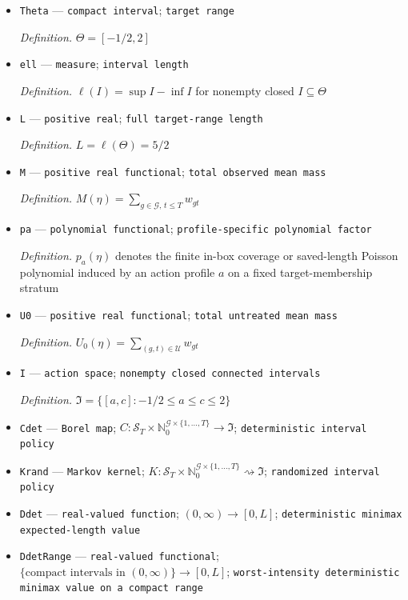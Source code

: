 \documentclass{article}
\begin{document}
\begin{itemize}
  \item \texttt{Theta} --- \texttt{compact interval}; \texttt{target range}
  \par\smallskip\noindent\emph{Definition.} \(\Theta=[-1/2,2]\)
  \item \texttt{ell} --- \texttt{measure}; \texttt{interval length}
  \par\smallskip\noindent\emph{Definition.} \(\ell(I)=\sup I-\inf I\) for nonempty closed \(I\subseteq\Theta\)
  \item \texttt{L} --- \texttt{positive real}; \texttt{full target-\allowbreak{}range length}
  \par\smallskip\noindent\emph{Definition.} \(L=\ell(\Theta)=5/2\)
  \item \texttt{M} --- \texttt{positive real functional}; \texttt{total observed mean mass}
  \par\smallskip\noindent\emph{Definition.} \(M(\eta)=\sum_{g\in\mathcal G,\,t\le T}w_{gt}\)
  \item \texttt{pa} --- \texttt{polynomial functional}; \texttt{profile-\allowbreak{}specific polynomial factor}
  \par\smallskip\noindent\emph{Definition.} \(p_a(\eta)\) denotes the finite in-box coverage or saved-length Poisson polynomial induced by an action profile \(a\) on a fixed target-membership stratum
  \item \texttt{U0} --- \texttt{positive real functional}; \texttt{total untreated mean mass}
  \par\smallskip\noindent\emph{Definition.} \(U_0(\eta)=\sum_{(g,t)\in\mathcal U}w_{gt}\)
  \item \texttt{I} --- \texttt{action space}; \texttt{nonempty closed connected intervals}
  \par\smallskip\noindent\emph{Definition.} \(\mathfrak I=\{[a,c]:-1/2\le a\le c\le2\}\)
  \item \texttt{Cdet} --- \texttt{Borel map}; \(C:\mathcal S_T\times\mathbb N_0^{\mathcal G\times\{1,\ldots,T\}}\to\mathfrak I\); \texttt{deterministic interval policy}
  \item \texttt{Krand} --- \texttt{Markov kernel}; \(K:\mathcal S_T\times\mathbb N_0^{\mathcal G\times\{1,\ldots,T\}}\rightsquigarrow\mathfrak I\); \texttt{randomized interval policy}
  \item \texttt{Ddet} --- \texttt{real-\allowbreak{}valued function}; \((0,\infty)\to[0,L]\); \texttt{deterministic minimax expected-\allowbreak{}length value}
  \item \texttt{DdetRange} --- \texttt{real-\allowbreak{}valued functional}; \(\{\text{compact intervals in }(0,\infty)\}\to[0,L]\); \texttt{worst-\allowbreak{}intensity deterministic minimax value on a compact range}

\end{itemize}
\end{document}
